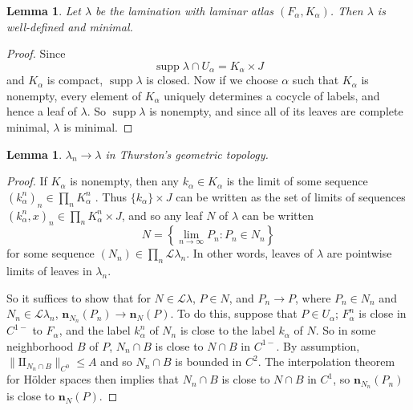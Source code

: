 \documentclass[final,12pt, leqno]{brownthesis}
\DeclareMathOperator{\supp}{supp}
\newcommand{\Two}{\mathrm{I\!I}}
\newcommand{\Leaves}{\mathcal L}
\newcommand{\normal}{\mathbf n}
\newtheorem{lemma}[theorem]{Lemma}
\theoremstyle{definition}
\numberwithin{equation}{section}
\begin{document}
\begin{lemma}
	Let $\lambda$ be the lamination with laminar atlas $(F_\alpha, K_\alpha)$.
	Then $\lambda$ is well-defined and minimal.
\end{lemma}
\begin{proof}
Since 
$$\supp \lambda \cap U_\alpha = K_\alpha \times J$$
and $K_\alpha$ is compact, $\supp \lambda$ is closed.
Now if we choose $\alpha$ such that $K_\alpha$ is nonempty, every element of $K_\alpha$ uniquely determines a cocycle of labels, and hence a leaf of $\lambda$.
So $\supp \lambda$ is nonempty, and since all of its leaves are complete minimal, $\lambda$ is minimal.
\end{proof}

\begin{lemma}
	$\lambda_n \to \lambda$ in Thurston's geometric topology.
\end{lemma}
\begin{proof}
If $K_\alpha$ is nonempty, then any $k_\alpha \in K_\alpha$ is the limit of some sequence $(k_\alpha^n)_n \in \prod_n K_\alpha^n$ \cite[Theorem 4.11]{nadler2017continuum}.
Thus $\{k_\alpha\} \times J$ can be written as the set of limits of sequences $(k_\alpha^n, x)_n \in \prod_n K_\alpha^n \times J$, and so any leaf $N$ of $\lambda$ can be written 
$$N = \left\{\lim_{n \to \infty} P_n: P_n \in N_n\right\}$$
for some sequence $(N_n) \in \prod_n \Leaves \lambda_n$.
In other words, leaves of $\lambda$ are pointwise limits of leaves in $\lambda_n$.

So it suffices to show that for $N \in \Leaves \lambda$, $P \in N$, and $P_n \to P$, where $P_n \in N_n$ and $N_n \in \Leaves \lambda_n$, $\normal_{N_n}(P_n) \to \normal_N(P)$.
To do this, suppose that $P \in U_\alpha$; $F_\alpha^n$ is close in $C^{1-}$ to $F_\alpha$, and the label $k^n_\alpha$ of $N_n$ is close to the label $k_\alpha$ of $N$.
So in some neighborhood $B$ of $P$, $N_n \cap B$ is close to $N \cap B$ in $C^{1-}$.
By assumption, $\|\Two_{N_n \cap B}\|_{C^0} \leq A$ and so $N_n \cap B$ is bounded in $C^2$.
The interpolation theorem for H\"older spaces then implies that $N_n \cap B$ is close to $N \cap B$ in $C^1$, so $\normal_{N_n}(P_n)$ is close to $\normal_N(P)$.
\end{proof}
\end{document}
